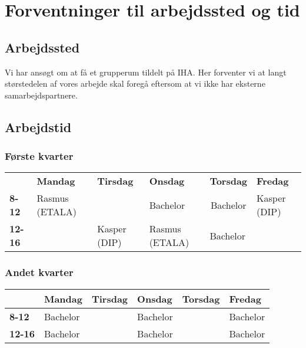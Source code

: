 \chapter{Forventninger til arbejdssted og tid}
\section{Arbejdssted}
Vi har ansøgt om at få et grupperum tildelt på IHA. Her forventer vi at langt størstedelen af vores arbejde skal foregå eftersom at vi ikke har eksterne samarbejdspartnere.
\section{Arbejdstid}
\subsection{Første kvarter}
\begin{table}[h]
\begin{tabular}{llllll}
               & \textbf{Mandag} & \textbf{Tirsdag} & \textbf{Onsdag} & \textbf{Torsdag}             & \textbf{Fredag} \\
\textbf{8-12}  & Rasmus (ETALA)  &                  & Bachelor        & \multicolumn{1}{c}{Bachelor} & Kasper (DIP)    \\
\textbf{12-16} &                 & Kasper (DIP)     & Rasmus (ETALA)  & Bachelor                     &                
\end{tabular}
\end{table}

\subsection{Andet kvarter}
\begin{table}[h]
\begin{tabular}{|l|l|l|l|l|l|}
\hline
               & \textbf{Mandag} & \textbf{Tirsdag} & \textbf{Onsdag} & \textbf{Torsdag}       & \textbf{Fredag} \\ \hline
\textbf{8-12}  & Bachelor        &                  & Bachelor        &  					   & Bachelor        \\ \hline
\textbf{12-16} & Bachelor        &                  & Bachelor        &                        & Bachelor        \\ \hline
\end{tabular}
\end{table}